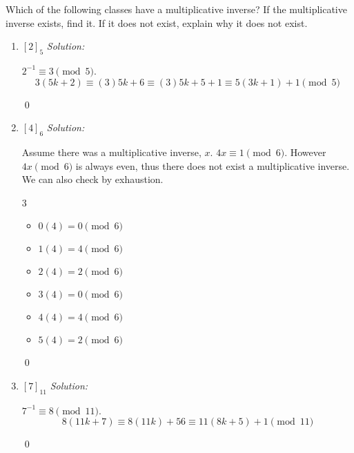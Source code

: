 \documentclass[12 pt]{article}
\newenvironment{problem}[2][Problem]{\begin{trivlist}
\item[\hskip \labelsep {\bfseries #1}\hskip \labelsep {\bfseries #2.}]}{\end{trivlist}}
\newenvironment{sol}
    {\emph{Solution:}
    }
    {
    \qed
    }
\theoremstyle{definition}
\begin{document}
\begin{problem}{3}
Which of the following classes have a multiplicative inverse? If
the multiplicative inverse exists, find it. If it does not exist, explain
why it does not exist.
\begin{enumerate}
    \item $[2]_5$
    \begin{sol}
    $2^{-1} \equiv 3 \pmod 5$. \[3(5k + 2) \equiv (3)5k + 6 \equiv (3)5k + 5 + 1 \equiv 5(3k + 1) + 1 \pmod 5\]
    \end{sol}
    \item $[4]_6$
    \begin{sol}
    Assume there was a multiplicative inverse, $x$. $4x \equiv 1 \pmod 6$. However $4x \pmod 6$ is always even, thus there does not exist a multiplicative inverse.\\
    We can also check by exhaustion.
    \begin{multicols}{3}
    \begin{itemize}
        \item $0(4) = 0 \pmod{6}$
        \item $1(4) = 4 \pmod{6}$
        \item $2(4) = 2 \pmod{6}$
        \item $3(4) = 0 \pmod{6}$
        \item $4(4) = 4 \pmod{6}$
        \item $5(4) = 2 \pmod{6}$
    \end{itemize}
    \end{multicols}
    \end{sol}
    \item $[7]_{11}$
    \begin{sol}
    $7^{-1}\equiv 8 \pmod{11}$.
    \[8(11k+7) \equiv 8(11k) + 56 \equiv 11(8k + 5) + 1 \pmod{11}\]
    \end{sol}
\end{enumerate}
\end{problem}
\end{document}
